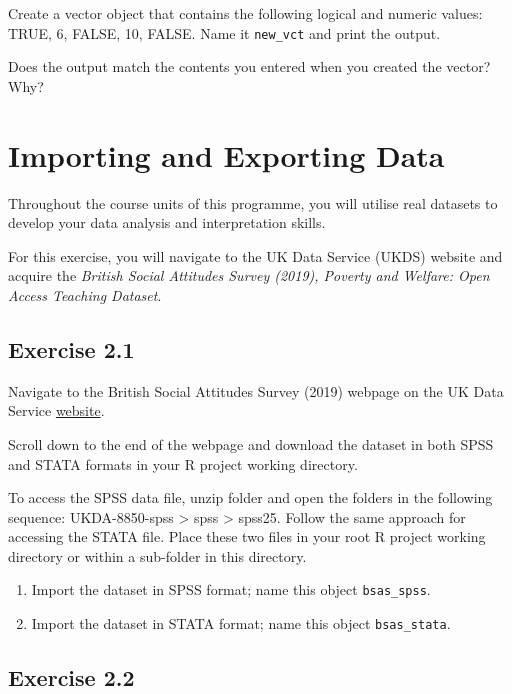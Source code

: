 \documentclass[
]{book}
\providecommand{\tightlist}{%
  \setlength{\itemsep}{0pt}\setlength{\parskip}{0pt}}
\begin{document}
Create a vector object that contains the following logical and numeric values: TRUE, 6, FALSE, 10, FALSE. Name it \texttt{new\_vct} and print the output.

Does the output match the contents you entered when you created the vector? Why?

\hypertarget{importing-and-exporting-data}{%
\section{Importing and Exporting Data}\label{importing-and-exporting-data}}

Throughout the course units of this programme, you will utilise real datasets to develop your data analysis and interpretation skills.

For this exercise, you will navigate to the UK Data Service (UKDS) website and acquire the \textit{British Social Attitudes Survey (2019), Poverty and Welfare: Open Access Teaching Dataset}.

\hypertarget{exercise-2.1}{%
\subsection{Exercise 2.1}\label{exercise-2.1}}

Navigate to the British Social Attitudes Survey (2019) webpage on the UK Data Service \href{https://beta.ukdataservice.ac.uk/datacatalogue/studies/study?id=8850#!/access-data}{website}.

Scroll down to the end of the webpage and download the dataset in both SPSS and STATA formats in your R project working directory.

To access the SPSS data file, unzip folder and open the folders in the following sequence: UKDA-8850-spss \textgreater{} spss \textgreater{} spss25. Follow the same approach for accessing the STATA file. Place these two files in your root R project working directory or within a sub-folder in this directory.

\begin{enumerate}
\def\labelenumi{\alph{enumi}.}
\tightlist
\item
  Import the dataset in SPSS format; name this object \texttt{bsas\_spss}.
\item
  Import the dataset in STATA format; name this object \texttt{bsas\_stata}.
\end{enumerate}

\hypertarget{exercise-2.2}{%
\subsection{Exercise 2.2}\label{exercise-2.2}}
\end{document}
